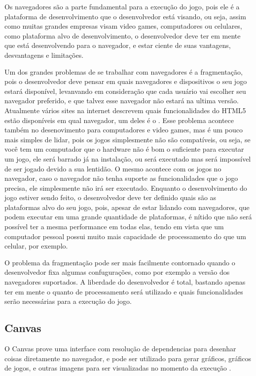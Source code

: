 Os navegadores são a parte fundamental para a execução do jogo, pois
ele é a plataforma de desenvolvimento que o desenvolvedor está visando,
ou seja, assim como muitas grandes empresas visam video games,
computadores ou celulares, como plataforma alvo de desenvolvimento, o
desenvolvedor deve ter em mente que está desenvolvendo para o
navegador, e estar ciente de suas vantagens, desvantagens e
limitações.

Um dos grandes problemas de se trabalhar com navegadores é a
fragmentação, pois o desenvolvedor deve pensar em quais navegadores e
dispositivos o seu jogo estará disponível, levanvando em consideração
que cada usuário vai escolher seu navegador preferido, e que talvez
esse navegador não estará na ultima versão. Atualmente vários sites na
internet descrevem quais funcionalidades do HTML5 estão disponíveis em
qual navegador, um deles é o \cite{diveintohtml5}.
Esse problema acontece também no desenovimento para computadores e
video games, mas é um pouco mais simples de lidar, pois os jogos
simplesmente não são compatíveis, ou seja, se você tem um computador
que o hardware não é bom o suficiente para executar um jogo, ele será
barrado já na instalação, ou será executado mas será impossível de ser
jogado devido a sua lentidão. O mesmo acontece com os jogos no
navegador, caso o navegador não tenha suporte as funcionalidades que o
jogo precisa, ele simplesmente não irá ser executado. Enquanto o
desenvolvimento do jogo estiver sendo feito, o desenvolvedor deve ter
definido quais são as plataformas alvo do seu jogo, pois, apesar de
estar lidando com navegadores, que podem executar em uma grande
quantidade de plataformas, é nítido que não será possível ter a mesma
performance em todas elas, tendo em vista que um computador pessoal
possui muito mais capacidade de processamento do que um celular, por
exemplo.

O problema da fragmentação pode ser mais facilmente contornado quando
o desenvolvedor fixa algumas confugurações, como por exemplo a versão
dos navegadores suportados. A liberdade do desenvolvedor é total,
bastando apenas ter em mente o quanto de processamento será utilizado
e quais funcionalidades serão necessárias para a execução do jogo.

\subsection{Canvas}

O Canvas prove uma interface com resolução de dependencias para
desenhar coisas diretamente no navegador, e pode ser utilizado para
gerar gráficos, gráficos de jogos, e outras imagens para ser
visualizadas no momento da execução \cite{w3ccanvas}.

